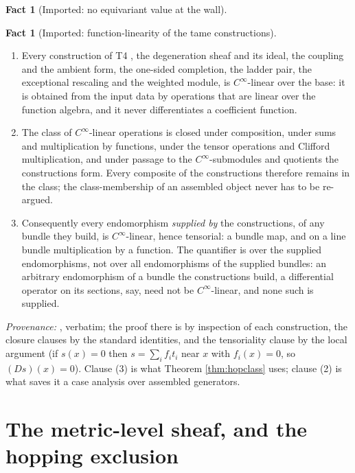 \documentclass[11pt]{article}
\theoremstyle{definition}
\newtheorem{fact}[theorem]{Fact}
\begin{document}
\begin{fact}[Imported: no equivariant value at the wall]
\end{fact}

\begin{fact}[Imported: function-linearity of the tame constructions]\label{fact:functionlinear}
\leavevmode
\begin{enumerate}
\item Every construction of T4 \cite{ButlerT4}, the degeneration sheaf and its ideal, the coupling and the ambient form, the one-sided completion, the ladder pair, the exceptional rescaling and the weighted module, is $C^\infty$-linear over the base: it is obtained from the input data by operations that are linear over the function algebra, and it never differentiates a coefficient function.
\item The class of $C^\infty$-linear operations is closed under composition, under sums and multiplication by functions, under the tensor operations and Clifford multiplication, and under passage to the $C^\infty$-submodules and quotients the constructions form. Every composite of the constructions therefore remains in the class; the class-membership of an assembled object never has to be re-argued.
\item Consequently every endomorphism \emph{supplied by} the constructions, of any bundle they build, is $C^\infty$-linear, hence tensorial: a bundle map, and on a line bundle multiplication by a function. The quantifier is over the supplied endomorphisms, not over all endomorphisms of the supplied bundles: an arbitrary endomorphism of a bundle the constructions build, a differential operator on its sections, say, need not be $C^\infty$-linear, and none such is supplied.
\end{enumerate}
\emph{Provenance:} \cite[Prop.~9.17]{ButlerT4}, verbatim; the proof there is by inspection of each construction, the closure clauses by the standard identities, and the tensoriality clause by the local argument (if $s(x) = 0$ then $s = \sum_i f_i t_i$ near $x$ with $f_i(x) = 0$, so $(Ds)(x) = 0$). Clause (3) is what Theorem \ref{thm:hopclass} uses; clause (2) is what saves it a case analysis over assembled generators.
\end{fact}

\section{The metric-level sheaf, and the hopping exclusion}\label{app:threeroutes}
\end{document}
